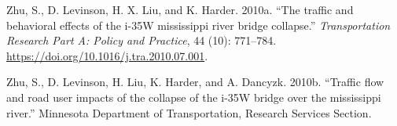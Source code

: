 \documentclass[]{ascelike-new}
\newlength{\cslhangindent}
\newenvironment{CSLReferences}[2] %
 {\begin{list}{}{%
  \setlength{\itemindent}{0pt}
  \setlength{\leftmargin}{0pt}
  \setlength{\parsep}{0pt}
  \ifodd #1
   \setlength{\leftmargin}{\cslhangindent}
   \setlength{\itemindent}{-1\cslhangindent}
  \fi
  \setlength{\itemsep}{#2\baselineskip}}}
 {\end{list}}
\begin{document}
\begin{CSLReferences}{1}{0}
Zhu, S., D. Levinson, H. X. Liu, and K. Harder. 2010a. {``The traffic
and behavioral effects of the i-35W mississippi river bridge
collapse.''} \emph{Transportation Research Part A: Policy and Practice},
44 (10): 771--784. \url{https://doi.org/10.1016/j.tra.2010.07.001}.

Zhu, S., D. Levinson, H. Liu, K. Harder, and A. Dancyzk. 2010b.
{``Traffic flow and road user impacts of the collapse of the i-35W
bridge over the mississippi river.''} Minnesota Department of
Transportation, Research Services Section.

\end{CSLReferences}
\end{document}
